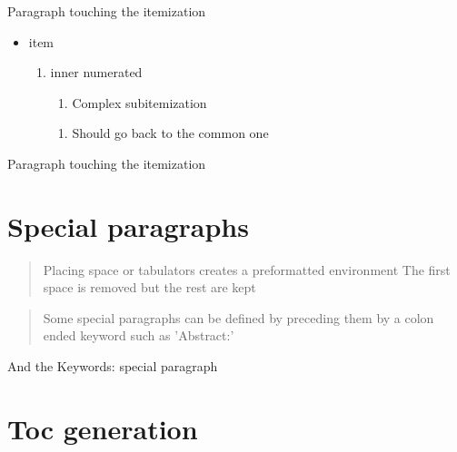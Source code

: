 Paragraph touching the itemization
\begin{itemize}
	\item  item
	\begin{enumerate}
		\item  inner numerated
		\begin{itemize}
			\begin{enumerate}
				\begin{itemize}
					\begin{enumerate}
						\item  Complex subitemization
					\end{enumerate}
				\end{itemize}
			\end{enumerate}
			\begin{itemize}
				\begin{itemize}
					\begin{enumerate}
						\item  Should go back to the common one
					\end{enumerate}
				\end{itemize}
			\end{itemize}
		\end{itemize}
	\end{enumerate}
\end{itemize}
Paragraph touching the itemization

\section{Special paragraphs}

\begin{quote}
Placing space or tabulators
creates a preformatted environment
	The first space is removed but the rest are kept
\end{quote}

\begin{abstract}
Some special paragraphs can be defined by preceding them by a
colon ended keyword such as 'Abstract:'
\end{abstract}

\begin{keywords}
And the Keywords: special paragraph
\end{keywords}


\section{Toc generation}

